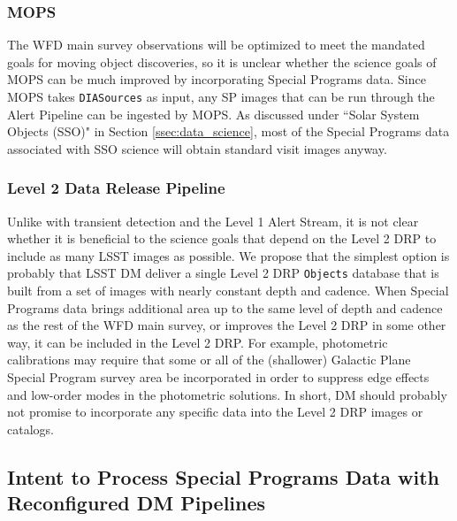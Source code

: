 \documentclass[DM,lsstdraft,toc]{lsstdoc}
\begin{document}
\subsubsection{MOPS}\label{ssec:dmplans_WFD_MOPS}

The WFD main survey observations will be optimized to meet the mandated goals for moving object discoveries, so it is unclear whether the science goals of MOPS can be much improved by incorporating Special Programs data. Since MOPS takes {\tt DIASources} as input, any SP images that can be run through the Alert Pipeline can be ingested by MOPS. As discussed under ``Solar System Objects (SSO)" in Section \ref{ssec:data_science}, most of the Special Programs data associated with SSO science will obtain standard visit images anyway.

\subsubsection{Level 2 Data Release Pipeline}\label{ssec:dmplans_WFD_L2}

Unlike with transient detection and the Level 1 Alert Stream, it is not clear whether it is beneficial to the science goals that depend on the Level 2 DRP to include as many LSST images as possible. We propose that the simplest option is probably that LSST DM deliver a single Level 2 DRP {\tt Objects} database that is built from a set of images with nearly constant depth and cadence. When Special Programs data brings additional area up to the same level of depth and cadence as the rest of the WFD main survey, or improves the Level 2 DRP in some other way, it can be included in the Level 2 DRP. For example, photometric calibrations may require that some or all of the (shallower) Galactic Plane Special Program survey area be incorporated in order to suppress edge effects and low-order modes in the photometric solutions. In short, DM should probably not promise to incorporate any specific data into the Level 2 DRP images or catalogs.


\subsection{Intent to Process Special Programs Data with Reconfigured DM Pipelines}\label{ssec:dmplans_reconfig}
\end{document}
